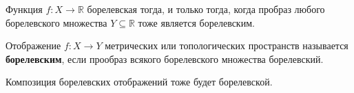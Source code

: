 \begin{to_thr}
\label{thr5.48}
    Функция $f \colon X \to \mathbb{R}$ борелевская тогда, и только тогда, когда пробраз любого борелевского множества $Y \subseteq \mathbb{R}$ тоже является борелевским.
\end{to_thr}

\begin{to_def}
    Отображение $f \colon X \to Y$ метрических или топологических пространств называется \textbf{борелевским}, если прообраз всякого борелевского множества борелевский.
\end{to_def}

\begin{to_thr}
\label{thr5.50}
    Композиция борелевских отображений тоже будет борелевской.
\end{to_thr}

